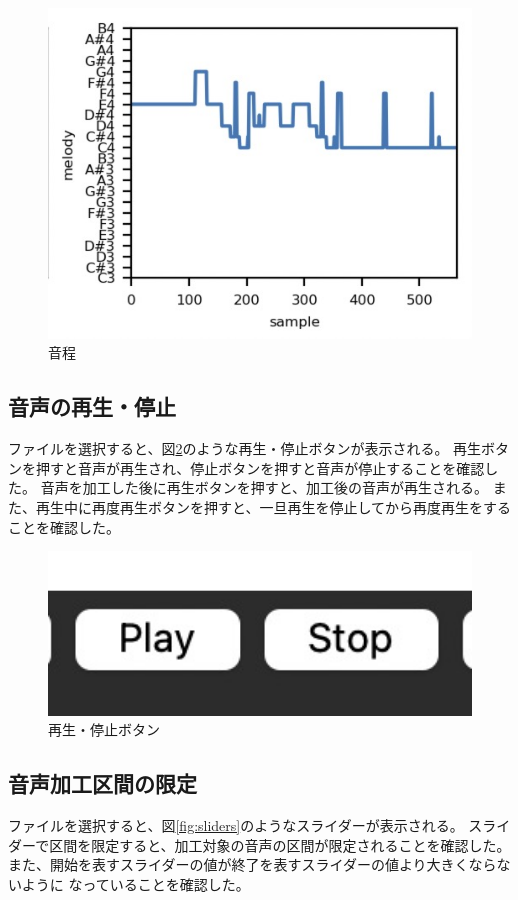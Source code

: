 \documentclass[a4paper,11pt]{jsarticle}
\begin{document}
\begin{figure}[h]
\centering
\includegraphics[keepaspectratio, width=13cm]
{./images/melody-tremolo.jpg}
\caption{音程}
\label{fig:pitch}
\end{figure}

\subsection{音声の再生・停止}
ファイルを選択すると、図\ref{fig:play_stop_button}のような再生・停止ボタンが表示される。
再生ボタンを押すと音声が再生され、停止ボタンを押すと音声が停止することを確認した。
音声を加工した後に再生ボタンを押すと、加工後の音声が再生される。
また、再生中に再度再生ボタンを押すと、一旦再生を停止してから再度再生をすることを確認した。

\begin{figure}[h]
\centering
\includegraphics[keepaspectratio, width=13cm]
{./images/play_stop_buttons.jpg}
\caption{再生・停止ボタン}
\label{fig:play_stop_button}
\end{figure}

\subsection{音声加工区間の限定}
ファイルを選択すると、図\ref{fig:sliders}のようなスライダーが表示される。
スライダーで区間を限定すると、加工対象の音声の区間が限定されることを確認した。
また、開始を表すスライダーの値が終了を表すスライダーの値より大きくならないように
なっていることを確認した。
\end{document}
